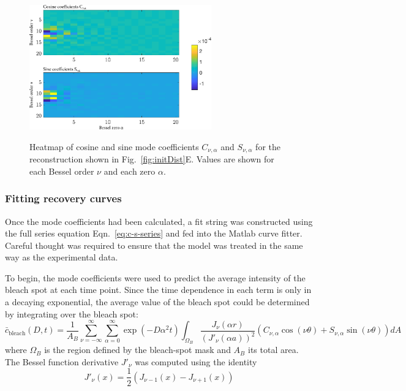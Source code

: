 \begin{figure}
\caption{Heatmap of cosine and sine mode coefficients $C_{\nu,\alpha}$ and $S_{\nu,\alpha}$ for the reconstruction shown in Fig.~\ref{fig:initDist}E. Values are shown for each Bessel order $\nu$ and each zero $\alpha$. \\}
\centering
\includegraphics[width=0.7\textwidth]{figs/ch04/rec_16_cos_sin_array_20_terms.pdf}
\label{fig:arrays}
\end{figure} 

\subsubsection{Fitting recovery curves}

Once the mode coefficients had been calculated, a fit string was constructed using the full series equation Eqn.~\ref{eq:c-s-series} and fed into the Matlab curve fitter.  Careful thought was required to ensure that the model was treated in the same way as the experimental data.

To begin, the mode coefficients were used to predict the average intensity of the bleach spot at each time point.  Since the time dependence in each term is only in a decaying exponential, the average value of the bleach spot could be determined by integrating over the bleach spot:
\begin{equation}
\bar{c}_\mathrm{bleach}(D,t) = \frac{1}{A_B}\sum_{\nu=-\infty}^{\infty} \sum_{\alpha = 0}^\infty   \exp\left(-D\alpha^2t\right)\int_{\Omega_B}\frac{J_\nu\left(\alpha r\right)}{\left(J'_\nu (\alpha a)\right)^2} \left(C_{\nu,\alpha}\cos(\nu\theta) + S_{\nu,\alpha} \sin(\nu\theta)\right) dA
\label{eq:c-s-series}
\end{equation}
where $\Omega_B$ is the region defined by the bleach-spot mask and $A_B$ its total area.  The Bessel function derivative $J'_\nu$ was computed using the identity
\begin{equation*}
J'_\nu(x) = \frac{1}{2}\left(J_{\nu-1}(x) - J_{\nu+1}(x)\right)
\end{equation*}

